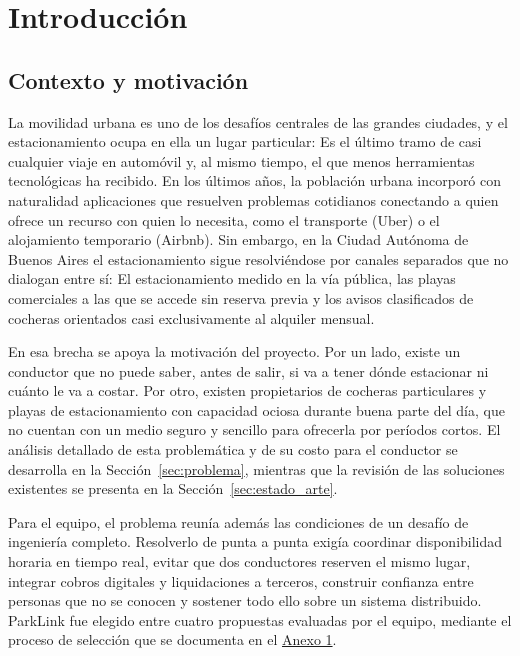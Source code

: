 \section{Introducción}\label{sec:introduccion}

\subsection{Contexto y motivación}

La movilidad urbana es uno de los desafíos centrales de las grandes ciudades, y el estacionamiento ocupa en ella un lugar particular: Es el último tramo de casi cualquier viaje en automóvil y, al mismo tiempo, el que menos herramientas tecnológicas ha recibido. En los últimos años, la población urbana incorporó con naturalidad aplicaciones que resuelven problemas cotidianos conectando a quien ofrece un recurso con quien lo necesita, como el transporte (Uber) o el alojamiento temporario (Airbnb). Sin embargo, en la Ciudad Autónoma de Buenos Aires el estacionamiento sigue resolviéndose por canales separados que no dialogan entre sí: El estacionamiento medido en la vía pública, las playas comerciales a las que se accede sin reserva previa y los avisos clasificados de cocheras orientados casi exclusivamente al alquiler mensual.

En esa brecha se apoya la motivación del proyecto. Por un lado, existe un conductor que no puede saber, antes de salir, si va a tener dónde estacionar ni cuánto le va a costar. Por otro, existen propietarios de cocheras particulares y playas de estacionamiento con capacidad ociosa durante buena parte del día, que no cuentan con un medio seguro y sencillo para ofrecerla por períodos cortos. El análisis detallado de esta problemática y de su costo para el conductor se desarrolla en la Sección~\ref{sec:problema}, mientras que la revisión de las soluciones existentes se presenta en la Sección~\ref{sec:estado_arte}.

Para el equipo, el problema reunía además las condiciones de un desafío de ingeniería completo. Resolverlo de punta a punta exigía coordinar disponibilidad horaria en tiempo real, evitar que dos conductores reserven el mismo lugar, integrar cobros digitales y liquidaciones a terceros, construir confianza entre personas que no se conocen y sostener todo ello sobre un sistema distribuido. ParkLink fue elegido entre cuatro propuestas evaluadas por el equipo, mediante el proceso de selección que se documenta en el \hyperref[anexo:seleccion]{Anexo 1}.

